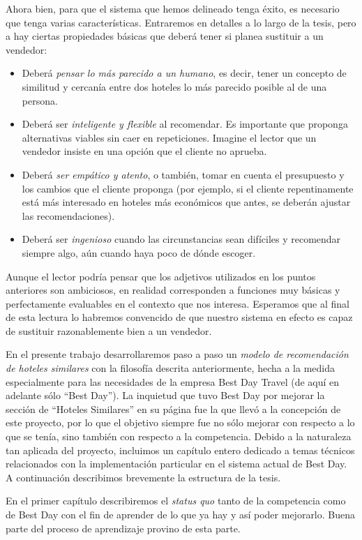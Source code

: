 \documentclass[12pt]{report}
\begin{document}
Ahora bien, para que el sistema que hemos delineado tenga éxito, es necesario que tenga varias características. Entraremos en detalles a lo largo de la tesis, pero a hay ciertas propiedades básicas que deberá tener si planea sustituir a un vendedor:
\begin{itemize}
	\item Deberá \emph{pensar lo más parecido a un humano}, es decir, tener un concepto de similitud y cercanía entre dos hoteles lo más parecido posible al de una persona.
	\item Deberá ser \emph{inteligente y flexible} al recomendar. Es importante que proponga alternativas viables sin caer en repeticiones. Imagine el lector que un vendedor insiste en una opción que el cliente no aprueba.
	\item Deberá \emph{ser empático y atento}, o también, tomar en cuenta el presupuesto y los cambios que el cliente proponga (por ejemplo, si el cliente repentinamente está más interesado en hoteles más económicos que antes, se deberán ajustar las recomendaciones).
	\item Deberá ser \emph{ingenioso} cuando las circunstancias sean difíciles y recomendar siempre algo, aún cuando haya poco de dónde escoger.
\end{itemize}
Aunque el lector podría pensar que los adjetivos utilizados en los puntos anteriores son ambiciosos, en realidad corresponden a funciones muy básicas y perfectamente evaluables en el contexto que nos interesa. Esperamos que al final de esta lectura lo habremos convencido de que nuestro sistema en efecto es capaz de sustituir razonablemente bien a un vendedor.

En el presente trabajo desarrollaremos paso a paso un \emph{modelo de recomendación de hoteles similares} con la filosofía descrita anteriormente, hecha a la medida especialmente para las necesidades de la empresa Best Day Travel (de aquí en adelante sólo ``Best Day''). La inquietud que tuvo Best Day por mejorar la sección de ``Hoteles Similares'' en su página fue la que llevó a la concepción de este proyecto, por lo que el objetivo siempre fue no sólo mejorar con respecto a lo que se tenía, sino también con respecto a la competencia. Debido a la naturaleza tan aplicada del proyecto, incluimos un capítulo entero dedicado a temas técnicos relacionados con la implementación particular en el sistema actual de Best Day. A continuación describimos brevemente la estructura de la tesis.

En el primer capítulo describiremos el \emph{status quo} tanto de la competencia como de Best Day con el fin de aprender de lo que ya hay y así poder mejorarlo. Buena parte del proceso de aprendizaje provino de esta parte.
\end{document}
